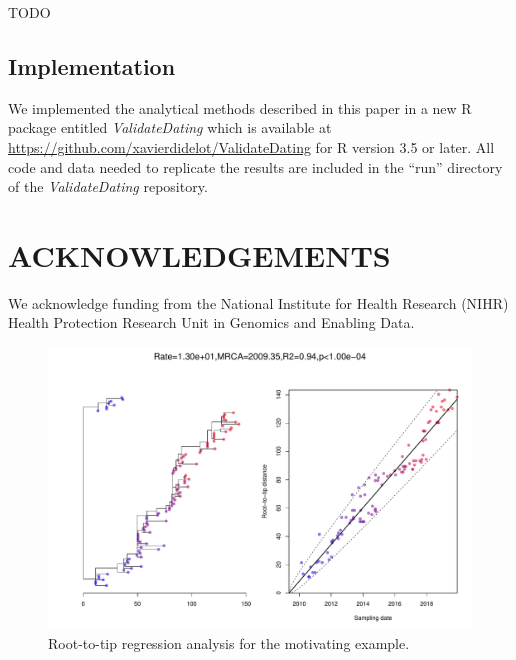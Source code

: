 \documentclass{article}
\begin{document}
TODO

\subsection*{Implementation}

We implemented the analytical methods described in this paper in a 
new R package entitled \emph{ValidateDating} which is available
at \url{https://github.com/xavierdidelot/ValidateDating} for R version 3.5 or later. 
All code and data needed to replicate the results are included in the ``run'' directory of the \emph{ValidateDating} repository.

\section*{ACKNOWLEDGEMENTS}

We acknowledge funding from the National Institute for Health Research (NIHR) Health Protection Research Unit in Genomics and Enabling Data.

\newpage


%

\newpage
\setcounter{figure}{0}
\setcounter{table}{0}
\makeatletter 
\renewcommand{\thefigure}{S\@arabic\c@figure} 
\renewcommand{\thetable}{S\@arabic\c@table} 
\makeatother

\begin{figure}[t!]
\begin{center}
\includegraphics[width=15cm]{exampleS1.pdf}
\end{center}
\caption{Root-to-tip regression analysis for the motivating example.
\label{fig:exampleS1}}
\end{figure}

\end{document}
